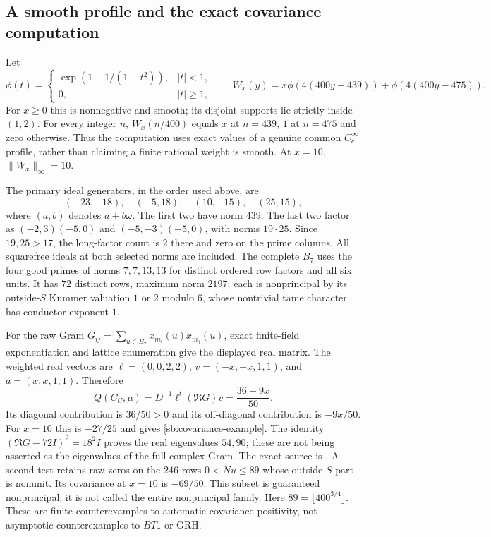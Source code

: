 \documentclass[11pt,oneside,openany]{book}
\theoremstyle{definition}\newtheorem{definition}[theorem]{Definition}
\theoremstyle{remark}\newtheorem{remark}[theorem]{Remark}
\begin{document}
\subsection{A smooth profile and the exact covariance computation}
Let
\[
 \phi(t)=\begin{cases}\exp(1-1/(1-t^2)),&|t|<1,\\0,&|t|\ge1,\end{cases}
 \qquad W_x(y)=x\phi(4(400y-439))+\phi(4(400y-475)).
\]
For $x\ge0$ this is nonnegative and smooth; its disjoint supports lie
strictly inside $(1,2)$. For every integer $n$, $W_x(n/400)$ equals
$x$ at $n=439$, $1$ at $n=475$ and zero otherwise. Thus the computation
uses exact values of a genuine common $C_c^\infty$ profile, rather than
claiming a finite rational weight is smooth. At $x=10$, $\|W_x\|_\infty=10$.

The primary ideal generators, in the order used above, are
\[
 (-23,-18),\quad(-5,18),\quad(10,-15),\quad(25,15),
\]
where $(a,b)$ denotes $a+b\omega$. The first two have norm $439$.
The last two factor as $(-2,3)(-5,0)$ and $(-5,-3)(-5,0)$, with norms
$19\cdot25$. Since $19,25>17$, the long-factor count is $2$ there and
zero on the prime columns. All squarefree ideals at both selected norms
are included. The complete $B_7$ uses the four good primes of norms
$7,7,13,13$ for distinct ordered row factors and all six units. It has
$72$ distinct rows, maximum norm $2197$; each is nonprincipal by its
outside-$S$ Kummer valuation $1$ or $2$ modulo $6$, whose nontrivial
tame character has conductor exponent $1$.

For the raw Gram $G_{ij}=\sum_{u\in B_7}x_{m_i}(u)
\overline{x_{m_j}(u)}$, exact finite-field exponentiation and lattice
enumeration give the displayed real matrix. The weighted real vectors are
$\ell=(0,0,2,2)$, $v=(-x,-x,1,1)$, and $a=(x,x,1,1)$.
Therefore
\[
 Q(C_U,\mu)=D^{-1}\ell^t(\Re G)v=\frac{36-9x}{50}.
\]
Its diagonal contribution is $36/50>0$ and its off-diagonal contribution
is $-9x/50$. For $x=10$ this is $-27/25$ and gives
\eqref{sb:covariance-example}. The identity
$(\Re G-72I)^2=18^2I$ proves the real eigenvalues $54,90$;
these are not being asserted as the eigenvalues of the full complex Gram.
The exact source is .
A second test retains raw zeros on the $246$ rows $0<Nu\le89$ whose
outside-$S$ part is nonunit. Its covariance at $x=10$ is $-69/50$.
This subset is guaranteed nonprincipal; it is not called the entire
nonprincipal family. Here $89=\lfloor400^{3/4}\rfloor$.
These are finite counterexamples to automatic covariance positivity,
not asymptotic counterexamples to $BT_\sigma$ or GRH.
\end{document}
